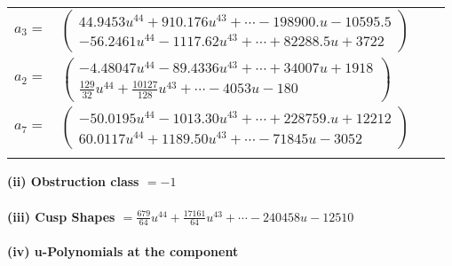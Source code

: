 \documentclass[1p]{elsarticle_modified}
\theoremstyle{definition}
\begin{document}
\begin{tabular}{m{7pt} m{180pt} m{7pt} m{180pt} }
\flushright $a_{3}=$&$\begin{pmatrix}44.9453 u^{44}+910.176 u^{43}+\cdots-198900. u-10595.5\\-56.2461 u^{44}-1117.62 u^{43}+\cdots+82288.5 u+3722\end{pmatrix}$ \\
\flushright $a_{2}=$&$\begin{pmatrix}-4.48047 u^{44}-89.4336 u^{43}+\cdots+34007 u+1918\\\frac{129}{32} u^{44}+\frac{10127}{128} u^{43}+\cdots-4053 u-180\end{pmatrix}$ \\
\flushright $a_{7}=$&$\begin{pmatrix}-50.0195 u^{44}-1013.30 u^{43}+\cdots+228759. u+12212\\60.0117 u^{44}+1189.50 u^{43}+\cdots-71845 u-3052\end{pmatrix}$\\&\end{tabular}
\flushleft \textbf{(ii) Obstruction class $= -1$}\\~\\
\flushleft \textbf{(iii) Cusp Shapes $= \frac{679}{64} u^{44}+\frac{17161}{64} u^{43}+\cdots-240458 u-12510$}\\~\\
\newpage\renewcommand{\arraystretch}{1}
\flushleft \textbf{(iv) u-Polynomials at the component}\newline \\
\end{document}
